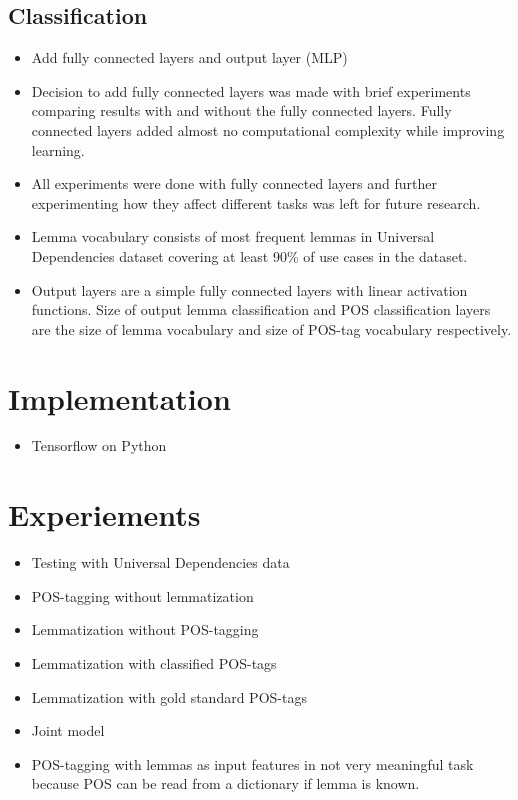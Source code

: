 \documentclass[12pt,a4paper,english
]{tutthesis}
\begin{document}
\subsection{Classification}
\label{ss:classification}
\begin{itemize}
\item Add fully connected layers and output layer (MLP)
\item Decision to add fully connected layers was made with brief experiments comparing results with and without the fully connected layers. Fully connected layers added almost no computational complexity while improving learning.
\item All experiments were done with fully connected layers and further experimenting how they affect different tasks was left for future research.
\item Lemma vocabulary consists of most frequent lemmas in Universal Dependencies dataset covering at least 90\% of use cases in the dataset.
\item Output layers are a simple fully connected layers with linear activation functions. Size of output lemma classification and POS classification layers are the size of lemma vocabulary and size of POS-tag vocabulary respectively.
\end{itemize}

\section{Implementation}
\label{se:implementation}
\begin{itemize}
\item Tensorflow on Python
\end{itemize}

\section{Experiements}
\label{se:experiements}
\begin{itemize}
\item Testing with Universal Dependencies data
\item POS-tagging without lemmatization
\item Lemmatization without POS-tagging
\item Lemmatization with classified POS-tags
\item Lemmatization with gold standard POS-tags
\item Joint model
\item POS-tagging with lemmas as input features in not very meaningful task because POS can be read from a dictionary if lemma is known.
\end{itemize}
\end{document}
